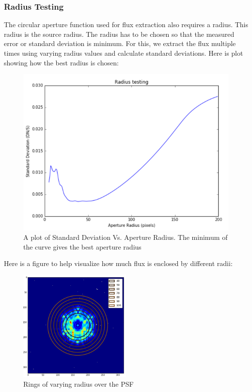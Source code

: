 \documentclass[conference]{IEEEtran}
\begin{document}
        \subsubsection{Radius Testing}
        The circular aperture function used for flux extraction also requires a radius. This radius is the source radius. The radius has to be chosen so that the measured error or standard deviation is minimum. For this, we extract the flux multiple times using varying radius values and calculate standard deviations. Here is plot showing how the best radius is chosen:
        \begin{figure}[H]
            \includegraphics[scale=0.5]{Radius}
            \caption{A plot of Standard Deviation Vs. Aperture Radius. The minimum of the curve gives the best aperture radius}
        \end{figure}
        
        Here is a figure to help visualize how much flux is enclosed by different radii:
        
        \begin{figure}[H]
            \includegraphics[width=0.5\textwidth]{varying_r.png}
            \caption{Rings of varying radius over the PSF}
        \end{figure}
        
\end{document}
